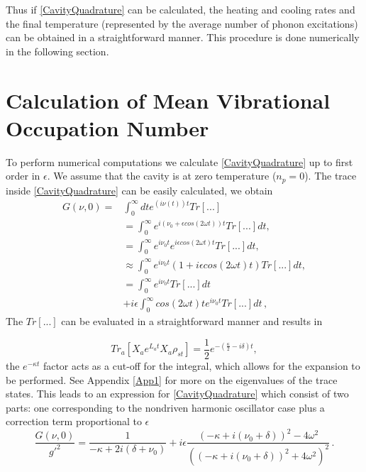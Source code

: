 \documentclass[reprint, amsmath,amssymb, aps,pra]{revtex4-1}
\begin{document}
Thus if \eqref{CavityQuadrature} can be calculated, the heating and
cooling rates and the final temperature (represented by the
average number of phonon excitations) can be obtained in a
straightforward manner. This procedure is done numerically in the
following section.

\section{Calculation of Mean Vibrational Occupation Number}\label{NumCal}

To perform numerical computations we calculate
\eqref{CavityQuadrature} up to first order in $\epsilon$. We assume
that the cavity is at zero temperature ($n_p=0$).  The trace inside
\eqref{CavityQuadrature} can be easily calculated, we obtain
\begin{align}
G(\nu,0)=&\int_0^\infty dt e^{(i\nu(t)) t}Tr[...]\nonumber\\
&= \int_0^\infty e^{i(\nu_0 + \epsilon cos(2\omega t) )t} Tr[...]dt, \nonumber\\
&=\int_0^\infty e^{i \nu_0 t}e^{i \epsilon cos(2\omega t)t} Tr[...]dt, \nonumber\\
&\approx \int_0^\infty e^{i \nu_0 t}(1+i \epsilon cos(2\omega t)t) Tr[...]dt, \nonumber\\
&=\int_0^\infty e^{i \nu_0 t}Tr[...]dt\nonumber\\
&+i\epsilon\int_0^\infty cos(2\omega t)t e^{i \nu_0 t}Tr[...]dt\, ,\nonumber
\end{align}The $Tr[...]$ can be evaluated in a straightforward manner and results in

\begin{equation}
Tr_a[X_a e^{L_a t} X_a \rho_{st}] = \frac{1}{2}e^{-(\frac{\kappa}{2}-i\delta) t},
\end{equation} the $e^{-\kappa t}$ factor acts as a cut-off for the integral, which allows for the expansion to be performed. See Appendix \ref{App1} for more on the eigenvalues of the trace states.
This leads to an expression for \eqref{CavityQuadrature} which consist
of two parts: one corresponding to the nondriven harmonic oscillator
case plus a correction term proportional to $\epsilon$
\begin{equation}
\frac{G(\nu,0)}{g'^2}= \frac{1}{-\kappa + 2i(\delta + \nu_0)} +i\epsilon\frac{(-\kappa + i(\nu_0 + \delta))^2 - 4\omega^2}{((-\kappa + i(\nu_0 + \delta))^2 + 4\omega^2)^2}\, .
\end{equation} %
\end{document}
